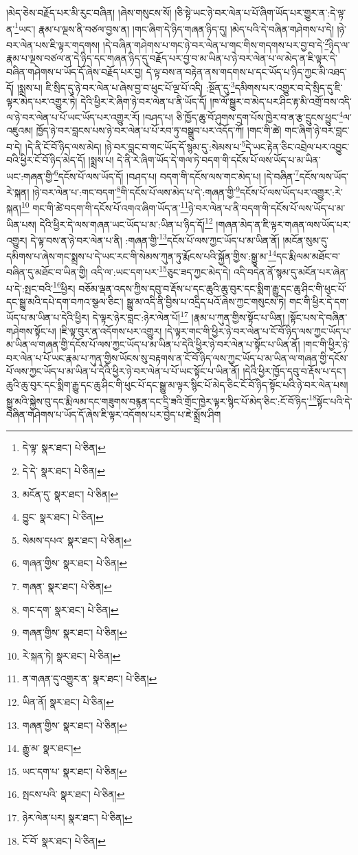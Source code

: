 །མེད་ཅེས་བརྗོད་པར་མི་རུང་བཞིན། །ཞེས་གསུངས་སོ། །ཅི་སྟེ་ཡང་ཉེ་བར་ལེན་པ་པོ་ཞིག་ཡོད་པར་གྱུར་ན་:དེ་ལྟ་ན་\footnote{དེ་ལྟ་  སྣར་ཐང་།  པེ་ཅིན། }ཡང་། རྣམ་པ་ལྔས་ནི་བཙལ་བྱས་ན། །གང་ཞིག་དེ་ཉིད་གཞན་ཉིད་དུ། །མེད་པའི་དེ་བཞིན་གཤེགས་པ་དེ། །ཉེ་བར་ལེན་པས་ཇི་ལྟར་གདགས། །དེ་བཞིན་གཤེགས་པ་གང་ཉེ་བར་ལེན་པ་གང་གིས་གདགས་པར་བྱ་བ་དེ་\footnote{དེ་དེ་  སྣར་ཐང་།  པེ་ཅིན། }ཉིད་ལ་རྣམ་པ་ལྔས་བཙལ་ན་དེ་ཉིད་དང་གཞན་ཉིད་དུ་བརྗོད་པར་བྱ་བ་མ་ཡིན་པ་ཉེ་བར་ལེན་པ་ལ་མེད་ན་ཇི་ལྟར་དེ་བཞིན་གཤེགས་པ་ཡོད་དོ་ཞེས་བརྗོད་པར་བྱ། དེ་ལྟ་བས་ན་བརྟེན་ནས་གདགས་པ་དང་ཡོད་པ་ཉིད་ཀྱང་མི་འཐད་དོ། །སྨྲས་པ། ཇི་སྲིད་དུ་ཉེ་བར་ལེན་པ་ཞེས་བྱ་བ་ཕུང་པོ་ལྔ་པོ་འདི། :སྔོན་དུ་\footnote{མངོན་དུ་  སྣར་ཐང་།  པེ་ཅིན། }དམིགས་པར་འགྱུར་བ་དེ་སྲིད་དུ་ཇི་ལྟར་མེད་པར་འགྱུར་ཏེ། དེའི་ཕྱིར་རེ་ཞིག་ཉེ་བར་ལེན་པ་ནི་ཡོད་དོ། །ཁ་ལོ་སྒྱུར་བ་མེད་པར་ཤིང་རྟ་མི་འགྲོ་བས་འདི་ལ་ཉེ་བར་ལེན་པ་པོ་ཡང་ཡོད་པར་འགྱུར་རོ། །བཤད་པ། ཅི་ཁྱོད་ཆུ་བོ་ཤུགས་དྲག་པོས་ཁྱེར་བ་ན་རྩ་དྲུངས་ཕྱུང་\footnote{བྱུང་  སྣར་ཐང་།  པེ་ཅིན། }ལ་འཇུའམ། ཁྱོད་ཉེ་བར་བླངས་པས་ཉེ་བར་ལེན་པ་པོ་རབ་ཏུ་བསྒྲུབ་པར་འདོད་ཀོ། །གང་གི་ཚེ། གང་ཞིག་ཉེ་བར་བླང་བ་དེ། །དེ་ནི་ངོ་བོ་ཉིད་ལས་མེད། །ཉེ་བར་བླང་བ་གང་ཡོད་དོ་སྙམ་དུ་:སེམས་པ་\footnote{སེམས་དཔའ་  སྣར་ཐང་།  པེ་ཅིན། }དེ་ཡང་རྟེན་ཅིང་འབྲེལ་པར་འབྱུང་བའི་ཕྱིར་ངོ་བོ་ཉིད་མེད་དོ། །སྨྲས་པ། དེ་ནི་རེ་ཞིག་ཡོད་དེ་གལ་ཏེ་བདག་གི་དངོས་པོ་ལས་ཡོད་པ་མ་ཡིན་ཡང་:གཞན་གྱི་\footnote{གཞན་གྱིས་  སྣར་ཐང་།  པེ་ཅིན། }དངོས་པོ་ལས་ཡོད་དོ། །བཤད་པ། བདག་གི་དངོས་ལས་གང་མེད་པ། །དེ་བཞིན་\footnote{གཞན་  སྣར་ཐང་།  པེ་ཅིན། }དངོས་ལས་ཡོད་རེ་སྐན། །ཉེ་བར་ལེན་པ་:གང་བདག་\footnote{གང་དག་  སྣར་ཐང་།  པེ་ཅིན། }གི་དངོས་པོ་ལས་མེད་པ་དེ་:གཞན་གྱི་\footnote{གཞན་གྱིས་  སྣར་ཐང་།  པེ་ཅིན། }དངོས་པོ་ལས་ཡོད་པར་འགྱུར་:རེ་སྐན།\footnote{རེ་སྐན་ཏེ།  སྣར་ཐང་།  པེ་ཅིན། } གང་གི་ཚེ་བདག་གི་དངོས་པོ་འགའ་ཞིག་ཡོད་ན་\footnote{ན་གཞན་དུ་འགྱུར་ན་  སྣར་ཐང་།  པེ་ཅིན། }ཉེ་བར་ལེན་པ་ནི་བདག་གི་དངོས་པོ་ལས་ཡོད་པ་མ་ཡིན་པས། དེའི་ཕྱིར་དེ་ལས་གཞན་ཡང་ཡོད་པ་མ་:ཡིན་པ་ཉིད་དོ།\footnote{ཡིན་ནོ།  སྣར་ཐང་།  པེ་ཅིན། } །གཞན་མེད་ན་ཇི་ལྟར་གཞན་ལས་ཡོད་པར་འགྱུར། དེ་ལྟ་བས་ན་ཉེ་བར་ལེན་པ་ནི། :གཞན་གྱི་\footnote{གཞན་གྱིས་  སྣར་ཐང་།  པེ་ཅིན། }དངོས་པོ་ལས་ཀྱང་ཡོད་པ་མ་ཡིན་ནོ། །མངོན་སུམ་དུ་དམིགས་པ་ཞེས་གང་སྨྲས་པ་དེ་ཡང་རང་གི་སེམས་ཀུན་ཏུ་རྨོངས་པའི་སྐྱོན་གྱིས་:སྒྱུ་མ་\footnote{རྒྱུ་མ་  སྣར་ཐང་། }དང་རྨི་ལམ་མཐོང་བ་བཞིན་དུ་མཐོང་བ་ཡིན་གྱི། འདི་ལ་:ཡང་དག་པར་\footnote{ཡང་དག་པ་  སྣར་ཐང་།  པེ་ཅིན། }ཅུང་ཟད་ཀྱང་མེད་དེ། འདི་བདེན་ནོ་སྙམ་དུ་མངོན་པར་ཞེན་པ་དེ་:སྤང་བའི་\footnote{སྤངས་པའི་  སྣར་ཐང་།  པེ་ཅིན། }ཕྱིར། བཅོམ་ལྡན་འདས་ཀྱིས་དབུ་བ་རྡོས་པ་དང་ཆུའི་ཆུ་བུར་དང་སྨིག་རྒྱུ་དང་ཆུ་ཤིང་གི་ཕུང་པོ་དང་སྒྱུ་མའི་དཔེ་དག་བཀའ་སྩལ་ཅིང་། སྒྱུ་མ་འདི་ནི་བྱིས་པ་འདྲིད་པའོ་ཞེས་ཀྱང་གསུངས་ཏེ། གང་གི་ཕྱིར་དེ་དག་ཡོད་པ་མ་ཡིན་པ་དེའི་ཕྱིར། དེ་ལྟར་ཉེར་བླང་:ཉེར་ལེན་པོ།\footnote{ཉེར་ལེན་པར།  སྣར་ཐང་།  པེ་ཅིན། } །རྣམ་པ་ཀུན་གྱིས་སྟོང་པ་ཡིན། །སྟོང་པས་དེ་བཞིན་གཤེགས་སྟོང་པ། །ཇི་ལྟ་བུར་ན་འདོགས་པར་འགྱུར། །དེ་ལྟར་གང་གི་ཕྱིར་ཉེ་བར་ལེན་པ་ངོ་བོ་ཉིད་ལས་ཀྱང་ཡོད་པ་མ་ཡིན་ལ་གཞན་གྱི་དངོས་པོ་ལས་ཀྱང་ཡོད་པ་མ་ཡིན་པ་དེའི་ཕྱིར་ཉེ་བར་ལེན་པ་སྟོང་པ་ཡིན་ནོ། །གང་གི་ཕྱིར་ཉེ་བར་ལེན་པ་པོ་ཡང་རྣམ་པ་ཀུན་གྱིས་ཡོངས་སུ་བརྟགས་ན་ངོ་བོ་ཉིད་ལས་ཀྱང་ཡོད་པ་མ་ཡིན་ལ་གཞན་གྱི་དངོས་པོ་ལས་ཀྱང་ཡོད་པ་མ་ཡིན་པ་དེའི་ཕྱིར་ཉེ་བར་ལེན་པ་པོ་ཡང་སྟོང་པ་ཡིན་ནོ། །དེའི་ཕྱིར་ཁྱོད་དབུ་བ་རྡོས་པ་དང་། ཆུའི་ཆུ་བུར་དང་སྨིག་རྒྱུ་དང་ཆུ་ཤིང་གི་ཕུང་པོ་དང་སྒྱུ་མ་ལྟར་སྙིང་པོ་མེད་ཅིང་ངོ་བོ་ཉིད་སྟོང་པའི་ཉེ་བར་ལེན་པས། སྒྱུ་མའི་སྐྱེས་བུ་དང་རྨི་ལམ་དང་གཟུགས་བརྙན་དང་དྲི་ཟའི་གྲོང་ཁྱེར་ལྟར་སྙིང་པོ་མེད་ཅིང་:ངོ་བོ་ཉིད་\footnote{ངོ་བོ་  སྣར་ཐང་།  པེ་ཅིན། }སྟོང་པའི་དེ་བཞིན་གཤེགས་པ་ཡོད་དོ་ཞེས་ཇི་ལྟར་འདོགས་པར་བྱེད་པ་ཇེ་སྨྲོས་ཤིག 